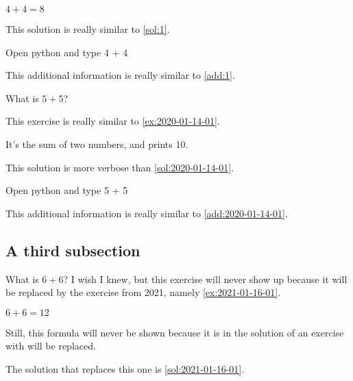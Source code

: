 \documentclass{book}
\begin{document}
\begin{solution}
  \(4 + 4 = 8\)

  This solution is really similar to \cref{sol:1}.
\end{solution}

\begin{additionalinformation}
Open python and type 4 + 4

This additional information is really similar to \cref{add:1}.
\end{additionalinformation}

\begin{exercise}[examdate={January 15, 2020}, examproblemnumber={1}, examproblemid={2020-01-15-01}]
  What is \(5 + 5\)?

  This exercise is really similar to \cref{ex:2020-01-14-01}.
\end{exercise}

\begin{solution}
It's the sum of two numbers, and prints 10.

This solution is more verbose than \cref{sol:2020-01-14-01}.
\end{solution}

\begin{additionalinformation}
Open python and type 5 + 5

This additional information is really similar to \cref{add:2020-01-14-01}.
\end{additionalinformation}

\subsection{A third subsection}

\begin{exercise}[examdate={January 16, 2020}, examproblemnumber={1}, examproblemid={2020-01-16-01}, replacedbyexamproblemid={2021-01-16-01}, replacementsinceacademicyear={2025/2026}]
  What is \(6 + 6\)? I wish I knew, but this exercise will never show up because it will be replaced by the exercise from 2021, namely \cref{ex:2021-01-16-01}.
\end{exercise}

\begin{solution}
  \(6 + 6 = 12\)

Still, this formula will never be shown because it is in the solution of an exercise with will be replaced.

The solution that replaces this one is \cref{sol:2021-01-16-01}.
\end{solution}
\end{document}
